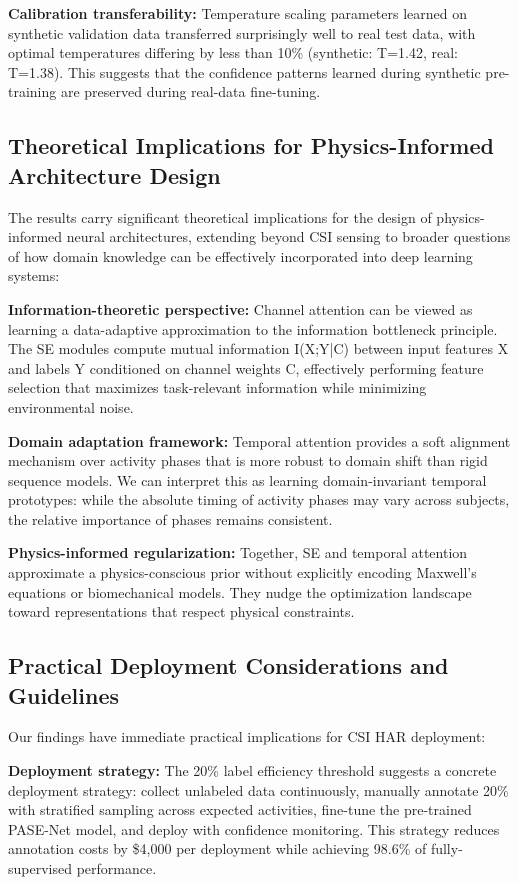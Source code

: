\documentclass[journal]{IEEEtran}
\begin{document}
\textbf{Calibration transferability:} Temperature scaling parameters learned on synthetic validation data transferred surprisingly well to real test data, with optimal temperatures differing by less than 10\% (synthetic: T=1.42, real: T=1.38). This suggests that the confidence patterns learned during synthetic pre-training are preserved during real-data fine-tuning.

\subsection{Theoretical Implications for Physics-Informed Architecture Design}

The results carry significant theoretical implications for the design of physics-informed neural architectures, extending beyond CSI sensing to broader questions of how domain knowledge can be effectively incorporated into deep learning systems:

\textbf{Information-theoretic perspective:} Channel attention can be viewed as learning a data-adaptive approximation to the information bottleneck principle. The SE modules compute mutual information I(X;Y|C) between input features X and labels Y conditioned on channel weights C, effectively performing feature selection that maximizes task-relevant information while minimizing environmental noise.

\textbf{Domain adaptation framework:} Temporal attention provides a soft alignment mechanism over activity phases that is more robust to domain shift than rigid sequence models. We can interpret this as learning domain-invariant temporal prototypes: while the absolute timing of activity phases may vary across subjects, the relative importance of phases remains consistent.

\textbf{Physics-informed regularization:} Together, SE and temporal attention approximate a physics-conscious prior without explicitly encoding Maxwell's equations or biomechanical models. They nudge the optimization landscape toward representations that respect physical constraints.

\subsection{Practical Deployment Considerations and Guidelines}

Our findings have immediate practical implications for CSI HAR deployment:

\textbf{Deployment strategy:} The 20\% label efficiency threshold suggests a concrete deployment strategy: collect unlabeled data continuously, manually annotate 20\% with stratified sampling across expected activities, fine-tune the pre-trained PASE-Net model, and deploy with confidence monitoring. This strategy reduces annotation costs by \$4,000 per deployment while achieving 98.6\% of fully-supervised performance.
\end{document}
